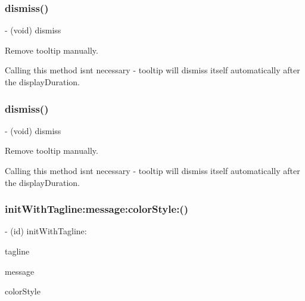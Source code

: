 \subsubsection{\texorpdfstring{dismiss()}{dismiss()}\hspace{0.1cm}{\footnotesize\ttfamily [4/5]}}
{\footnotesize\ttfamily -\/ (void) dismiss \begin{DoxyParamCaption}{ }\end{DoxyParamCaption}}

Remove tooltip manually.

Calling this method isn\textquotesingle{}t necessary -\/ tooltip will dismiss itself automatically after the {\ttfamily display\+Duration}. \mbox{\label{interfaceFBTooltipView_a569c1c43f92dd609d969f75bf151ae87}} 
\subsubsection{\texorpdfstring{dismiss()}{dismiss()}\hspace{0.1cm}{\footnotesize\ttfamily [5/5]}}
{\footnotesize\ttfamily -\/ (void) dismiss \begin{DoxyParamCaption}{ }\end{DoxyParamCaption}}

Remove tooltip manually.

Calling this method isn\textquotesingle{}t necessary -\/ tooltip will dismiss itself automatically after the {\ttfamily display\+Duration}. \mbox{\label{interfaceFBTooltipView_a810fa96eb99ba7b3055b90e9214a401c}} 
\subsubsection{\texorpdfstring{init\+With\+Tagline\+:message\+:color\+Style\+:()}{initWithTagline:message:colorStyle:()}\hspace{0.1cm}{\footnotesize\ttfamily [1/5]}}
{\footnotesize\ttfamily -\/ (id) init\+With\+Tagline\+: \begin{DoxyParamCaption}\item[{(N\+S\+String $\ast$)}]{tagline }\item[{message:(N\+S\+String $\ast$)}]{message }\item[{colorStyle:(F\+B\+Tooltip\+Color\+Style)}]{color\+Style }\end{DoxyParamCaption}}

